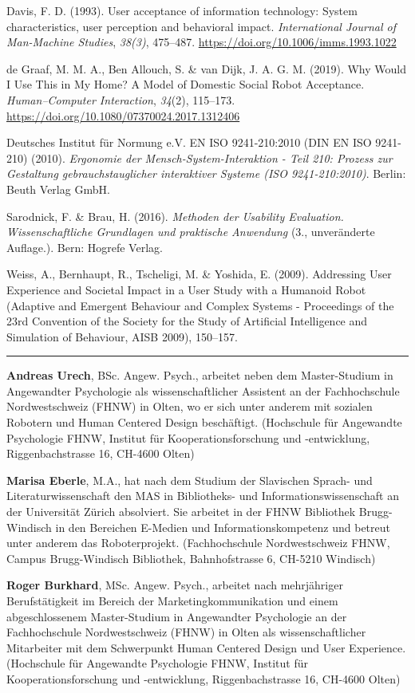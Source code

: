 \documentclass[a4paper,
fontsize=11pt,
oneside,
numbers=noperiodatend,
parskip=half-,
bibliography=totoc,
final
]{scrartcl}
\begin{document}
Davis, F. D. (1993). User acceptance of information technology: System
characteristics, user perception and behavioral impact.
\emph{International Journal of Man-Machine Studies}, \emph{38(3)},
475--487. \href{https://doi.org/10.1006/imms.1993.1022}{https://doi.org/10.1006/imms.1993.1022}

de Graaf, M. M. A., Ben Allouch, S. \& van Dijk, J. A. G. M. (2019). Why
Would I Use This in My Home? A Model of Domestic Social Robot
Acceptance. \emph{Human--Computer Interaction}, \emph{34}(2), 115--173.
\href{https://doi.org/10.1080/07370024.2017.1312406}{https://doi.org/10.1080/07370024.2017.1312406}

Deutsches Institut für Normung e.V. EN ISO 9241-210:2010 (DIN EN ISO
9241-210) (2010). \emph{Ergonomie der Mensch-System-Interaktion - Teil
210: Prozess zur Gestaltung gebrauchstauglicher interaktiver Systeme
(ISO 9241-210:2010)}. Berlin: Beuth Verlag GmbH.

Sarodnick, F. \& Brau, H. (2016). \emph{Methoden der Usability
Evaluation. Wissenschaftliche Grundlagen und praktische Anwendung} (3.,
unveränderte Auflage.). Bern: Hogrefe Verlag.

Weiss, A., Bernhaupt, R., Tscheligi, M. \& Yoshida, E. (2009).
Addressing User Experience and Societal Impact in a User Study with a
Humanoid Robot (Adaptive and Emergent Behaviour and Complex Systems -
Proceedings of the 23rd Convention of the Society for the Study of
Artificial Intelligence and Simulation of Behaviour, AISB 2009),
150--157.

\begin{center}\rule{0.5\linewidth}{0.5pt}\end{center}

\textbf{Andreas Urech}, BSc. Angew. Psych., arbeitet neben dem
Master-Studium in Angewandter Psychologie als wissenschaftlicher
Assistent an der Fachhochschule Nordwestschweiz (FHNW) in Olten, wo er
sich unter anderem mit sozialen Robotern und Human Centered Design
beschäftigt. (Hochschule für Angewandte Psychologie FHNW, Institut für
Kooperationsforschung und -entwicklung, Riggenbachstrasse 16, CH-4600
Olten)

\textbf{Marisa Eberle}, M.A., hat nach dem Studium der Slavischen
Sprach- und Literaturwissenschaft den MAS in Bibliotheks- und
Informationswissenschaft an der Universität Zürich absolviert. Sie
arbeitet in der FHNW Bibliothek Brugg-Windisch in den Bereichen E-Medien
und Informationskompetenz und betreut unter anderem das Roboterprojekt.
(Fachhochschule Nordwestschweiz FHNW, Campus Brugg-Windisch Bibliothek,
Bahnhofstrasse 6, CH-5210 Windisch)

\textbf{Roger Burkhard}, MSc. Angew. Psych., arbeitet nach mehrjähriger
Berufstätigkeit im Bereich der Marketingkommunikation und einem
abgeschlossenem Master-Studium in Angewandter Psychologie an der
Fachhochschule Nordwestschweiz (FHNW) in Olten als wissenschaftlicher
Mitarbeiter mit dem Schwerpunkt Human Centered Design und User
Experience. (Hochschule für Angewandte Psychologie FHNW, Institut für
Kooperationsforschung und -entwicklung, Riggenbachstrasse 16, CH-4600
Olten)
\end{document}
